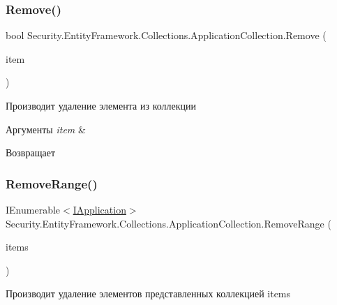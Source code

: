 \subsubsection{\texorpdfstring{Remove()}{Remove()}}
{\footnotesize\ttfamily bool Security.\+Entity\+Framework.\+Collections.\+Application\+Collection.\+Remove (\begin{DoxyParamCaption}\item[{\hyperlink{interface_security_1_1_interfaces_1_1_model_1_1_i_application}{I\+Application}}]{item }\end{DoxyParamCaption})}



Производит удаление элемента из коллекции 


\begin{DoxyParams}{Аргументы}
{\em item} & \\
\hline
\end{DoxyParams}
\begin{DoxyReturn}{Возвращает}

\end{DoxyReturn}
\mbox{\label{class_security_1_1_entity_framework_1_1_collections_1_1_application_collection_ad11e3582f6b2b46a6f01756edd246e0f}} 
\subsubsection{\texorpdfstring{Remove\+Range()}{RemoveRange()}}
{\footnotesize\ttfamily I\+Enumerable$<$\hyperlink{interface_security_1_1_interfaces_1_1_model_1_1_i_application}{I\+Application}$>$ Security.\+Entity\+Framework.\+Collections.\+Application\+Collection.\+Remove\+Range (\begin{DoxyParamCaption}\item[{I\+Enumerable$<$ \hyperlink{interface_security_1_1_interfaces_1_1_model_1_1_i_application}{I\+Application} $>$}]{items }\end{DoxyParamCaption})}



Производит удаление элементов представленных коллекцией items 


